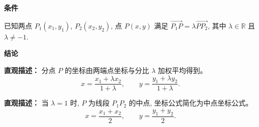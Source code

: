\begin{statementbox}
	\textbf{\textcolor{CStatement}{条件}}
	\begin{description}[style=nextline, leftmargin=2.8em, labelsep=0.5em, itemsep=0.35em]
		\item[\textbf{\textcolor{CStatement}{条件1（分点条件）：}}]
			已知两点 $P_1(x_1,y_1)$, $P_2(x_2,y_2)$, 点 $P(x,y)$ 满足 $\overrightarrow{P_1P} = \lambda \overrightarrow{PP_2}$, 其中 $\lambda\in\mathbb{R}$ 且 $\lambda\neq -1$.
	\end{description}
	\textbf{\textcolor{CStatement}{结论}}
	\begin{description}[style=nextline, leftmargin=2.8em, labelsep=0.5em, itemsep=0.45em]
		\item[\textbf{\textcolor{CStatement}{结论一（坐标公式）：}}]
			\textbf{\textcolor{CStatement}{直观描述：}}
			分点 $P$ 的坐标由两端点坐标与分比 $\lambda$ 加权平均得到。
			\[
				x = \frac{x_1 + \lambda x_2}{1+\lambda},
				\qquad
				y = \frac{y_1 + \lambda y_2}{1+\lambda}.
			\]
		\item[\textbf{\textcolor{CStatement}{推广结论（中点特例）：}}]
			\textbf{\textcolor{CStatement}{直观描述：}}
			当 $\lambda=1$ 时, $P$ 为线段 $P_1P_2$ 的中点, 坐标公式简化为中点坐标公式。
			\[
				x = \frac{x_1 + x_2}{2},
				\qquad
				y = \frac{y_1 + y_2}{2}.
			\]
	\end{description}

\end{statementbox}
